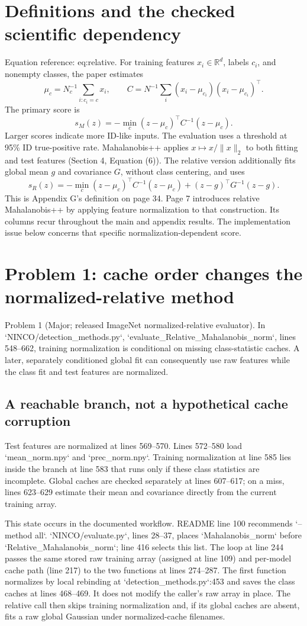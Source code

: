\documentclass[10pt]{article}
\begin{document}
\section*{Definitions and the checked scientific dependency}
Equation reference: eq:relative. For training features \(x_i\in\mathbb R^d\), labels \(c_i\), and nonempty classes, the paper estimates \[\mu_c=N_c^{-1}\sum_{i:c_i=c}x_i,\qquad
 C=N^{-1}\sum_i(x_i-\mu_{c_i})(x_i-\mu_{c_i})^\top .\] The primary score is \[s_M(z)=-\min_c(z-\mu_c)^\top C^{-1}(z-\mu_c).\] Larger scores indicate more ID-like inputs. The evaluation uses a threshold at 95\% ID true-positive rate. Mahalanobis++ applies \(x\mapsto x/\|x\|_2\) to both fitting and test features (Section 4, Equation (6)). The relative version additionally fits global mean \(g\) and covariance \(G\), without class centering, and uses \[
 s_R(z)=-\min_c(z-\mu_c)^\top C^{-1}(z-\mu_c)
            +(z-g)^\top G^{-1}(z-g).\] This is Appendix G’s definition on page 34. Page 7 introduces relative Mahalanobis++ by applying feature normalization to that construction. Its columns recur throughout the main and appendix results. The implementation issue below concerns that specific normalization-dependent score.\par
\section*{Problem 1: cache order changes the normalized-relative method}
Problem 1 (Major; released ImageNet normalized-relative evaluator).  In `NINCO/detection\_methods.py`, `evaluate\_Relative\_Mahalanobis\_norm`, lines 548–662, training normalization is conditional on missing class-statistic caches. A later, separately conditioned global fit can consequently use raw features while the class fit and test features are normalized.\par
\subsection*{A reachable branch, not a hypothetical cache corruption}
Test features are normalized at lines 569–570. Lines 572–580 load `mean\_norm.npy` and `prec\_norm.npy`. Training normalization at line 585 lies inside the branch at line 583 that runs only if these class statistics are incomplete. Global caches are checked separately at lines 607–617; on a miss, lines 623–629 estimate their mean and covariance directly from the current training array.\par
This state occurs in the documented workflow. README line 100 recommends `–method all`. `NINCO/evaluate.py`, lines 28–37, places `Mahalanobis\_norm` before `Relative\_Mahalanobis\_norm`; line 416 selects this list. The loop at line 244 passes the same stored raw training array (assigned at line 109) and per-model cache path (line 217) to the two functions at lines 274–287. The first function normalizes by local rebinding at `detection\_methods.py`:453 and saves the class caches at lines 468–469. It does not modify the caller’s raw array in place. The relative call then skips training normalization and, if its global caches are absent, fits a raw global Gaussian under normalized-cache filenames.\par
\end{document}
